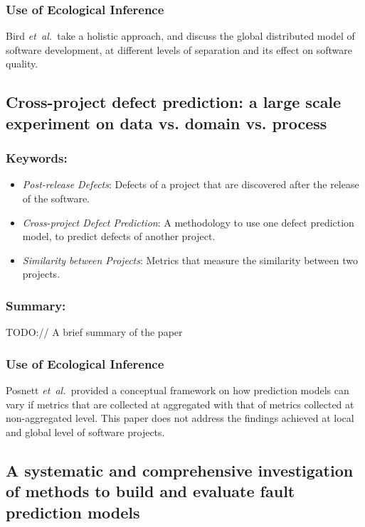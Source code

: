 \documentclass{sig-alternate-05-2015}
\newcommand{\etal}{\mbox{\emph{et al.\ }}}
\begin{document}
\subsubsection{Use of Ecological Inference}
Bird \etal take a holistic approach, and discuss the global distributed model of software development, at different levels of separation and its effect on software quality.

\subsection{Cross-project defect prediction: a large scale experiment on data vs. domain vs. process \cite{Zimmerman:2009}}

\subsubsection{Keywords:}
\begin{itemize}
\item \emph{Post-release Defects}: Defects of a project that are discovered after the release of the software.
\item \emph{Cross-project Defect Prediction}: A methodology to use one defect prediction model, to predict defects of another project.
\item \emph{Similarity between Projects}: Metrics that measure the similarity between two projects.
\end{itemize} 

\subsubsection{Summary:}
TODO:// A brief summary of the paper

\subsubsection{Use of Ecological Inference}
Posnett \etal provided a conceptual framework on how prediction models can vary if metrics that are collected at aggregated with that of metrics collected at non-aggregated level. This paper does not address the findings achieved at local and global level of software projects.

\subsection{A systematic and comprehensive investigation of methods to build and evaluate fault prediction models \cite{Arisholm:2010}}
\end{document}

